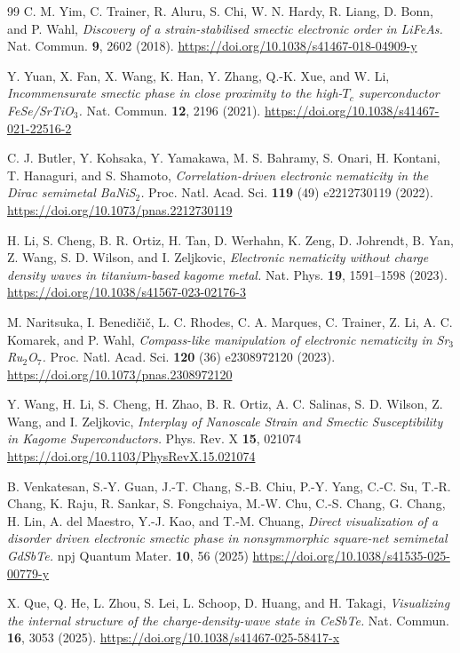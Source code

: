 \documentclass[reprint,superscriptaddress,prb,aps]{revtex4-2}
\begin{document}
\begin{thebibliography}{99}
C. M. Yim, C. Trainer, R. Aluru, S. Chi, W. N. Hardy, R. Liang, D. Bonn, and P. Wahl,
\textit{Discovery of a strain-stabilised smectic electronic order in LiFeAs.}
Nat. Commun. \textbf{9}, 2602 (2018).
\url{https://doi.org/10.1038/s41467-018-04909-y}


Y. Yuan, X. Fan, X. Wang, K. Han, Y. Zhang, Q.-K. Xue, and W. Li,
\textit{Incommensurate smectic phase in close proximity to the high-$T_{c}$ superconductor FeSe/SrTiO$_{3}$.}
Nat. Commun. \textbf{12}, 2196 (2021).
\url{https://doi.org/10.1038/s41467-021-22516-2}


C. J. Butler, Y. Kohsaka, Y. Yamakawa, M. S. Bahramy, S. Onari, H. Kontani, T. Hanaguri, and S. Shamoto,
\textit{Correlation-driven electronic nematicity in the Dirac semimetal BaNiS$_{2}$.}
Proc. Natl. Acad. Sci. \textbf{119} (49) e2212730119 (2022).
\url{https://doi.org/10.1073/pnas.2212730119}


H. Li, S. Cheng, B. R. Ortiz, H. Tan, D. Werhahn, K. Zeng, D. Johrendt, B. Yan, Z. Wang, S. D. Wilson, and I. Zeljkovic,
\textit{Electronic nematicity without charge density waves in titanium-based kagome metal.}
Nat. Phys. \textbf{19}, 1591--1598 (2023).
\url{https://doi.org/10.1038/s41567-023-02176-3}


M. Naritsuka, I. Benedi\v{c}i\v{c}, L. C. Rhodes, C. A. Marques, C. Trainer, Z. Li, A. C. Komarek, and P. Wahl,
\textit{Compass-like manipulation of electronic nematicity in Sr$_{3}$Ru$_{2}$O$_{7}$.}
Proc. Natl. Acad. Sci. \textbf{120} (36) e2308972120 (2023).
\url{https://doi.org/10.1073/pnas.2308972120}


Y. Wang, H. Li, S. Cheng, H. Zhao, B. R. Ortiz, A. C. Salinas, S. D. Wilson, Z. Wang, and I. Zeljkovic,
\textit{Interplay of Nanoscale Strain and Smectic Susceptibility in Kagome Superconductors.}
Phys. Rev. X \textbf{15}, 021074
\url{https://doi.org/10.1103/PhysRevX.15.021074}


B. Venkatesan, S.-Y. Guan, J.-T. Chang, S.-B. Chiu, P.-Y. Yang, C.-C. Su, T.-R. Chang, K. Raju, R. Sankar, S. Fongchaiya, M.-W. Chu, C.-S. Chang, G. Chang, H. Lin, A. del Maestro, Y.-J. Kao, and T.-M. Chuang,
\textit{Direct visualization of a disorder driven electronic smectic phase in nonsymmorphic square-net semimetal GdSbTe.}
npj Quantum Mater. \textbf{10}, 56 (2025)
\url{https://doi.org/10.1038/s41535-025-00779-y}


X. Que, Q. He, L. Zhou, S. Lei, L. Schoop, D. Huang, and H. Takagi,
\textit{Visualizing the internal structure of the charge-density-wave state in CeSbTe.}
Nat. Commun. \textbf{16}, 3053 (2025).
\url{https://doi.org/10.1038/s41467-025-58417-x}



\end{thebibliography}
\end{document}

